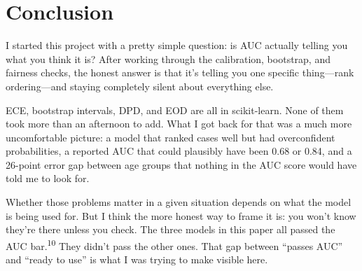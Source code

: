 \documentclass[12pt]{article}
\begin{document}
\section{Conclusion}

I started this project with a pretty simple question: is AUC actually
telling you what you think it is? After working through the calibration,
bootstrap, and fairness checks, the honest answer is that it's telling you
one specific thing---rank ordering---and staying completely silent about
everything else.

ECE, bootstrap intervals, DPD, and EOD are all in scikit-learn. None of
them took more than an afternoon to add. What I got back for that was a much
more uncomfortable picture: a model that ranked cases well but had
overconfident probabilities, a reported AUC that could plausibly have been
0.68 or 0.84, and a 26-point error gap between age groups that nothing in
the AUC score would have told me to look for.

Whether those problems matter in a given situation depends on what the model
is being used for. But I think the more honest way to frame it is: you won't
know they're there unless you check. The three models in this paper all
passed the AUC bar.\textsuperscript{10} They didn't pass the other ones.
That gap between ``passes AUC'' and ``ready to use'' is what I was trying
to make visible here.
\end{document}
